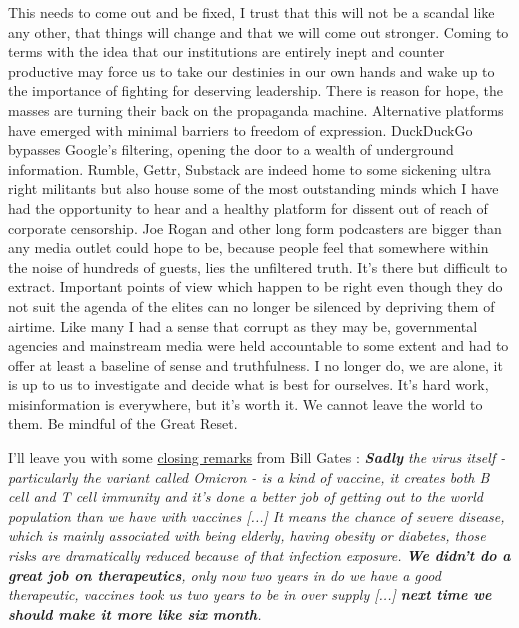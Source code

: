 \documentclass[11pt,a4paper,notitlepage]{report}
\begin{document}
This needs to come out and be fixed, I trust that this will not be a scandal like any other, that things will change and that we will come out stronger. Coming to terms with the idea that our institutions are entirely inept and counter productive may force us to take our destinies in our own hands and wake up to the importance of fighting for deserving leadership. There is reason for hope, the masses are turning their back on the propaganda machine. Alternative platforms have emerged with minimal barriers to freedom of expression. DuckDuckGo bypasses Google's filtering, opening the door to a wealth of underground information. Rumble, Gettr, Substack are indeed home to some sickening ultra right militants but also house some of the most outstanding minds which I have had the opportunity to hear and a healthy platform for dissent out of reach of corporate censorship. Joe Rogan and other long form podcasters are bigger than any media outlet could hope to be, because people feel that somewhere within the noise of hundreds of guests, lies the unfiltered truth. It's there but difficult to extract. Important points of view which happen to be right even though they do not suit the agenda of the elites can no longer be silenced by depriving them of airtime. Like many I had a sense that corrupt as they may be, governmental agencies and mainstream media were held accountable to some extent and had to offer at least a baseline of sense and truthfulness. I no longer do, we are alone, it is up to us to investigate and decide what is best for ourselves. It's hard work, misinformation is everywhere, but it's worth it. We cannot leave the world to them. Be mindful of the Great Reset.

I'll leave you with some \href{https://twitter.com/disclosetv/status/1494810193175195652}{closing remarks} from Bill Gates \cite{twitter19022022}: \textit{\textbf{Sadly} the virus itself - particularly the variant called Omicron - is a kind of vaccine, it creates both B cell and T cell immunity and it's done a better job of getting out to the world population than we have with vaccines [...] It means the chance of severe disease, which is mainly associated with being elderly, having obesity or diabetes, those risks are dramatically reduced because of that infection exposure. \textbf{We didn't do a great job on therapeutics}, only now two years in do we have a good therapeutic, vaccines took us two years to be in over supply [...] \textbf{next time we should make it more like six month}.}

\clearpage
\end{document}

